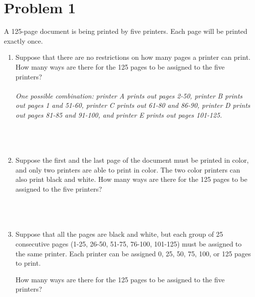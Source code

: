 \documentclass{amsart}
\theoremstyle{definition}
\theoremstyle{Exercise}
\theoremstyle{remark}
\theoremstyle{rule}
\numberwithin{equation}{section}
\begin{document}

\section*{Problem 1}

A 125-page document is being printed by five printers. Each page will be printed exactly once.
 \begin{enumerate}[label=(\alph*)]
 \item  Suppose that there are no restrictions on how many pages a printer can print. How many ways are there for the 125 pages to be assigned to the five printers?\\\\
{\it One possible combination: printer A prints out pages 2-50, printer B prints out pages 1 and 51-60, printer C prints out 61-80 and 86-90, printer D prints out pages 81-85 and 91-100, and printer E prints out pages 101-125.}\\\\
        \\\\
 \item Suppose the first and the last page of the document must be printed in color, and only two printers are able to print in color. The two color printers can also print black and white. How many ways are there for the 125 pages to be assigned to the five printers?\\\\
        \\\\
 \item Suppose that all the pages are black and white, but each group of 25 consecutive pages (1-25, 26-50, 51-75, 76-100, 101-125) must be assigned to the same printer. Each printer can be assigned 0, 25, 50, 75, 100, or 125 pages to print.

How many ways are there for the 125 pages to be assigned to the five printers?\\\\
        \\\\
   \end{enumerate}
 \newpage
\end{document}
